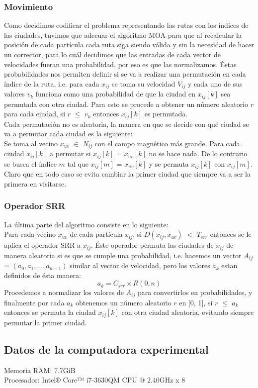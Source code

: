 \documentclass[12pt]{article}
\begin{document}
\subsubsection*{Movimiento}
Como decidimos codificar el problema representando las rutas con los índices de las ciudades, tuvimos que adecuar el algoritmo MOA para que al recalcular la posición de cada partícula cada ruta siga siendo válida y sin la necesidad de hacer un corrector, para lo cuál decidimos que las entradas de cada vector de velocidades fueran una probabilidad, por eso es que las normalizamos. Éstas probabilidades nos permiten definir si se va a realizar una permutación en cada índice de la ruta, i.e. para cada $x_{ij}$ se toma su velocidad $V_{ij}$ y cada uno de sus valores $v_k$ funciona como una probabilidad de que la ciudad en $x_{ij}[k]$ sea permutada con otra ciudad. Para esto se procede a obtener un número aleatorio $r$ para cada ciudad, si $r$ $\leqslant$ $v_k$ entonces $x_{ij}[k]$ es permutada. \\

\noindent Cada permutación no es aleatoria, la manera en que se decide con qué ciudad se va a permutar cada ciudad es la siguiente: \\

\noindent Se toma al vecino $x_{uv}$ $\in$ $N_{ij}$ con el campo magnético más grande. Para cada ciudad $x_{ij}[k]$ a permutar
si $x_{ij}[k]$ = $x_{uv}[k]$ no se hace nada. De lo contrario se busca el índice $m$ tal que $x_{ij}[m]$ = $x_{uv}[k]$ y se permuta $x_{ij}[k]$ con $x_{ij}[m]$. Claro que en todo caso se evita cambiar la primer ciudad que siempre va a ser la primera en visitarse.

\subsubsection*{Operador SRR}

La última parte del algoritmo consiste en lo siguiente: \\
Para cada vecino $x_{uv}$  de cada partícula $x_{ij}$, si $D(x_{ij}, x_{uv})$ $<$ $T_{srr}$ entonces se le aplica el operador SRR a $x_{ij}$. Éste operador permuta las ciudades de $x_{ij}$ de manera aleatoria si es que se cumple una probabilidad, i.e. hacemos un vector
$A_{ij}$ = $(a_0, a_1,...,a_{n-1})$ similar al vector de velocidad, pero los valores $a_k$ estan definidos de ésta manera:
\begin{equation}
  a_k = C_{srr} \times R(0, n)
\end{equation}
Procedemos a normalizar los valores de $A_{ij}$ para convertirlos en probabilidades, y finalmente por cada $a_k$ obtenemos un número aleatorio $r$ en [0, 1], si $r$ $\leqslant$ $a_k$ entonces se permuta la ciudad $x_{ij}[k]$ con otra ciudad aleatoria, evitando siempre permutar la primer ciudad.

\newpage

\subsection*{Datos de la computadora experimental}
\noindent Memoria RAM: 7.7GiB \\
Procesador: Intel® Core™ i7-3630QM CPU @ 2.40GHz x 8 
\end{document}

